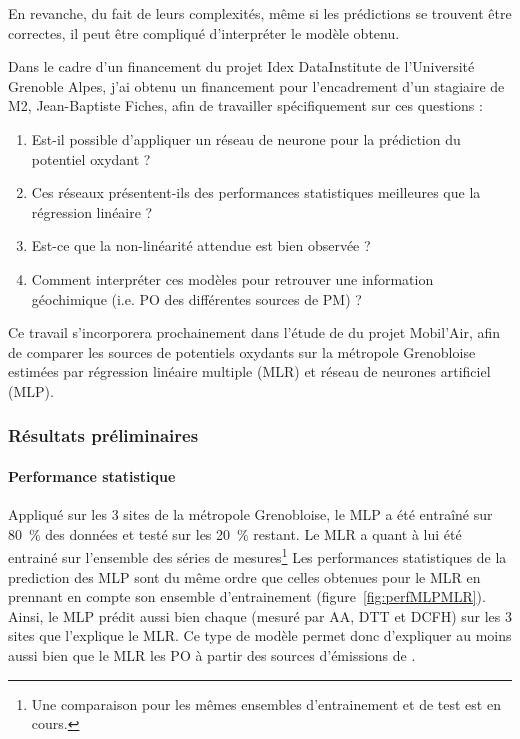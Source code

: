 En revanche, du fait de leurs complexités, même si les prédictions se trouvent être
correctes, il peut être compliqué d'interpréter le modèle obtenu.


Dans le cadre d'un financement du projet Idex DataInstitute de l'Université Grenoble Alpes, j'ai
obtenu un financement pour l'encadrement d'un stagiaire de M2, Jean-Baptiste Fiches, afin
de travailler spécifiquement sur ces questions :
\begin{enumerate}
    \item Est-il possible d'appliquer un réseau de neurone pour la prédiction du potentiel
        oxydant ?
    \item Ces réseaux présentent-ils des performances statistiques meilleures que la
        régression linéaire ?
    \item Est-ce que la non-linéarité attendue est bien observée ?
    \item Comment interpréter ces modèles pour retrouver une information géochimique (i.e.
        PO des différentes sources de PM) ?
\end{enumerate}
Ce travail s'incorporera prochainement dans l'étude de \cite{borlazaUrbaninprep.} du
projet Mobil'Air, afin de comparer les sources de potentiels oxydants sur la
métropole Grenobloise estimées par régression linéaire multiple (MLR) et réseau de
neurones artificiel (MLP).


\subsubsection{Résultats préliminaires}%
\label{ssub:résultats_préliminaires}

\paragraph{Performance statistique}%
\label{par:performance_statistique}

Appliqué sur les 3 sites de la métropole Grenobloise, le MLP a été entraîné sur
\SI{80}{\percent} des données et testé sur les \SI{20}{\percent} restant. Le MLR a quant à
lui été entrainé sur l'ensemble des séries de mesures\footnote{Une comparaison pour les mêmes
ensembles d'entrainement et de test est en cours.}
Les performances statistiques de la prediction des MLP sont du même ordre que celles
obtenues pour le MLR en prennant en compte son ensemble d'entrainement (figure~\ref{fig:perfMLPMLR}).
Ainsi, le MLP prédit aussi bien chaque \POv{}
(mesuré par AA, DTT et DCFH) sur les 3 sites que l'explique le MLR.
Ce type de modèle permet donc d'expliquer au moins aussi bien que le MLR les PO à partir
des sources d'émissions de \PMdix.

